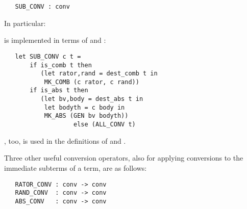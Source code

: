 \begin{holboxed}
\begin{verbatim}
   SUB_CONV : conv
\end{verbatim}\end{holboxed}

\noindent In particular:


\noindent {} is implemented in terms of
 and :

\begin{hol}\begin{verbatim}
   let SUB_CONV c t =
       if is_comb t then
          (let rator,rand = dest_comb t in
           MK_COMB (c rator, c rand))
       if is_abs t then
          (let bv,body = dest_abs t in
           let bodyth = c body in
           MK_ABS (GEN bv bodyth))
                   else (ALL_CONV t)
\end{verbatim}\end{hol}

\noindent {}, too, is used in the definitions of
 and .

Three other useful conversion operators, also for applying conversions
to the immediate subterms of a term, are as follows:


\begin{holboxed}
\begin{verbatim}
   RATOR_CONV : conv -> conv
   RAND_CONV  : conv -> conv
   ABS_CONV   : conv -> conv
\end{verbatim}\end{holboxed}

